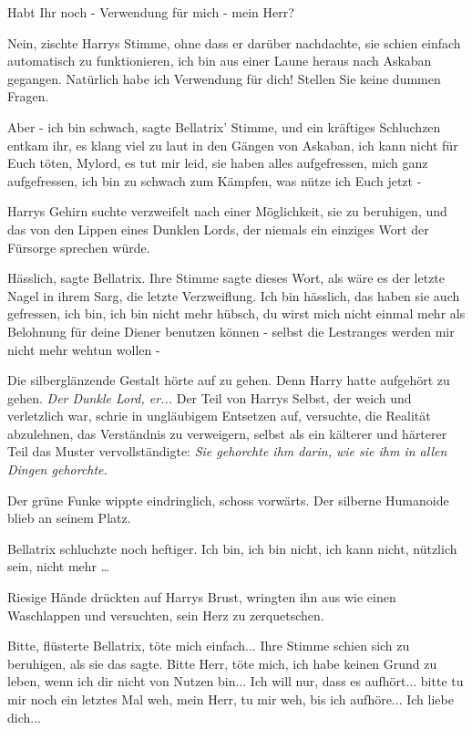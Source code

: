 \glqq{}Habt Ihr noch - Verwendung für mich - mein Herr?\grqq{}

\glqq{}Nein\grqq{}, zischte Harrys Stimme, ohne dass er darüber nachdachte, sie
schien einfach automatisch zu funktionieren, \glqq{}ich bin aus einer Laune
heraus nach Askaban gegangen. Natürlich habe ich Verwendung für dich! Stellen
Sie keine dummen Fragen.\grqq{}

\glqq{}Aber - ich bin schwach\grqq{}, sagte Bellatrix' Stimme, und ein kräftiges
Schluchzen entkam ihr, es klang viel zu laut in den Gängen von Askaban, \glqq{}
ich kann nicht für Euch töten, Mylord, es tut mir leid, sie haben alles
aufgefressen, mich ganz aufgefressen, ich bin zu schwach zum Kämpfen, was nütze
ich Euch jetzt -\grqq{}

Harrys Gehirn suchte verzweifelt nach einer Möglichkeit, sie zu beruhigen, und
das von den Lippen eines Dunklen Lords, der niemals ein einziges Wort der
Fürsorge sprechen würde.

\glqq{}Hässlich\grqq{}, sagte Bellatrix. Ihre Stimme sagte dieses Wort, als wäre
es der letzte Nagel in ihrem Sarg, die letzte Verzweiflung. \glqq{}Ich bin
hässlich, das haben sie auch gefressen, ich bin, ich bin nicht mehr hübsch, du
wirst mich nicht einmal mehr als Belohnung für deine Diener benutzen können -
selbst die Lestranges werden mir nicht mehr wehtun wollen -\grqq{}

Die silberglänzende Gestalt hörte auf zu gehen. Denn Harry hatte aufgehört zu
gehen. \emph{Der Dunkle Lord, er...} Der Teil von Harrys Selbst, der weich und
verletzlich war, schrie in ungläubigem Entsetzen auf, versuchte, die Realität
abzulehnen, das Verständnis zu verweigern, selbst als ein kälterer und härterer
Teil das Muster vervollständigte: \emph{Sie gehorchte ihm darin, wie sie ihm in
allen Dingen gehorchte.}

Der grüne Funke wippte eindringlich, schoss vorwärts. Der silberne Humanoide
blieb an seinem Platz.

Bellatrix schluchzte noch heftiger. \glqq{}Ich bin, ich bin nicht, ich kann
nicht, nützlich sein, nicht mehr …\grqq{}

Riesige Hände drückten auf Harrys Brust, wringten ihn aus wie einen Waschlappen
und versuchten, sein Herz zu zerquetschen.

\glqq{}Bitte\grqq{}, flüsterte Bellatrix, \glqq{}töte mich einfach...\grqq{} Ihre Stimme
schien sich zu beruhigen, als sie das sagte. \glqq{}Bitte Herr, töte mich, ich
habe keinen Grund zu leben, wenn ich dir nicht von Nutzen bin... Ich will nur,
dass es aufhört... bitte tu mir noch ein letztes Mal weh, mein Herr, tu mir weh,
bis ich aufhöre... Ich liebe dich...\grqq{}

